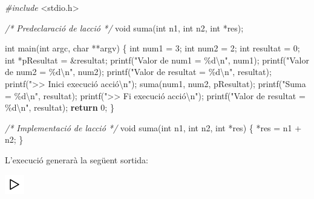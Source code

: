 \documentclass[
]{book}
\newenvironment{Shaded}{\begin{snugshade}}{\end{snugshade}}
\newcommand{\CommentTok}[1]{\textcolor[rgb]{0.56,0.35,0.01}{\textit{#1}}}
\newcommand{\ControlFlowTok}[1]{\textcolor[rgb]{0.13,0.29,0.53}{\textbf{#1}}}
\newcommand{\DataTypeTok}[1]{\textcolor[rgb]{0.13,0.29,0.53}{#1}}
\newcommand{\DecValTok}[1]{\textcolor[rgb]{0.00,0.00,0.81}{#1}}
\newcommand{\ImportTok}[1]{#1}
\newcommand{\NormalTok}[1]{#1}
\newcommand{\PreprocessorTok}[1]{\textcolor[rgb]{0.56,0.35,0.01}{\textit{#1}}}
\newcommand{\SpecialCharTok}[1]{\textcolor[rgb]{0.00,0.00,0.00}{#1}}
\newcommand{\StringTok}[1]{\textcolor[rgb]{0.31,0.60,0.02}{#1}}
\begin{document}
\begin{Shaded}
\begin{Highlighting}[]
\PreprocessorTok{\#include }\ImportTok{\textless{}stdio.h\textgreater{}}

\CommentTok{/* Predeclaració de l\textquotesingle{}acció */}
\DataTypeTok{void}\NormalTok{ suma(}\DataTypeTok{int}\NormalTok{ n1, }\DataTypeTok{int}\NormalTok{ n2, }\DataTypeTok{int}\NormalTok{ *res);}

\DataTypeTok{int}\NormalTok{ main(}\DataTypeTok{int}\NormalTok{ argc, }\DataTypeTok{char}\NormalTok{ **argv) \{}
    \DataTypeTok{int}\NormalTok{ num1 = }\DecValTok{3}\NormalTok{;}
    \DataTypeTok{int}\NormalTok{ num2 = }\DecValTok{2}\NormalTok{;}
    \DataTypeTok{int}\NormalTok{ resultat = }\DecValTok{0}\NormalTok{;}
    \DataTypeTok{int}\NormalTok{ *pResultat = \&resultat;}
\NormalTok{    printf(}\StringTok{"Valor de num1 = \%d}\SpecialCharTok{\textbackslash{}n}\StringTok{"}\NormalTok{, num1);}
\NormalTok{    printf(}\StringTok{"Valor de num2 = \%d}\SpecialCharTok{\textbackslash{}n}\StringTok{"}\NormalTok{, num2);}
\NormalTok{    printf(}\StringTok{"Valor de resultat = \%d}\SpecialCharTok{\textbackslash{}n}\StringTok{"}\NormalTok{, resultat);}
\NormalTok{    printf(}\StringTok{"\textgreater{}\textgreater{} Inici execució acció}\SpecialCharTok{\textbackslash{}n}\StringTok{"}\NormalTok{); }
\NormalTok{    suma(num1, num2, pResultat);}
\NormalTok{    printf(}\StringTok{"Suma = \%d}\SpecialCharTok{\textbackslash{}n}\StringTok{"}\NormalTok{, resultat);}
\NormalTok{    printf(}\StringTok{"\textgreater{}\textgreater{} Fi execució acció}\SpecialCharTok{\textbackslash{}n}\StringTok{"}\NormalTok{);}
\NormalTok{    printf(}\StringTok{"Valor de resultat = \%d}\SpecialCharTok{\textbackslash{}n}\StringTok{"}\NormalTok{, resultat);}
    \ControlFlowTok{return} \DecValTok{0}\NormalTok{;}
\NormalTok{\}}

\CommentTok{/* Implementació de l\textquotesingle{}acció */}
\DataTypeTok{void}\NormalTok{ suma(}\DataTypeTok{int}\NormalTok{ n1, }\DataTypeTok{int}\NormalTok{ n2, }\DataTypeTok{int}\NormalTok{ *res) \{}
\NormalTok{    *res = n1 + n2;}
\NormalTok{\}}
\end{Highlighting}
\end{Shaded}

L'execució generarà la següent sortida:

\includegraphics{./img/play.png}
\end{document}
